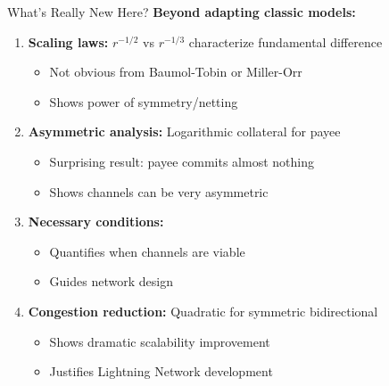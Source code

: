\documentclass[aspectratio=169,12pt]{beamer}
\begin{document}
\begin{frame}{What's Really New Here?}
\textbf{Beyond adapting classic models:}

\begin{enumerate}
    \item \textbf{Scaling laws:} $r^{-1/2}$ vs $r^{-1/3}$ characterize fundamental difference
    \begin{itemize}
        \item Not obvious from Baumol-Tobin or Miller-Orr
        \item Shows power of symmetry/netting
    \end{itemize}
    
    \vspace{0.2cm}
    \item \textbf{Asymmetric analysis:} Logarithmic collateral for payee
    \begin{itemize}
        \item Surprising result: payee commits almost nothing
        \item Shows channels can be very asymmetric
    \end{itemize}
    
    \vspace{0.2cm}
    \item \textbf{Necessary conditions:}
    \begin{itemize}
        \item Quantifies when channels are viable
        \item Guides network design
    \end{itemize}
    
    \vspace{0.2cm}
    \item \textbf{Congestion reduction:} Quadratic for symmetric bidirectional
    \begin{itemize}
        \item Shows dramatic scalability improvement
        \item Justifies Lightning Network development
    \end{itemize}
\end{enumerate}
\end{frame}
\end{document}
